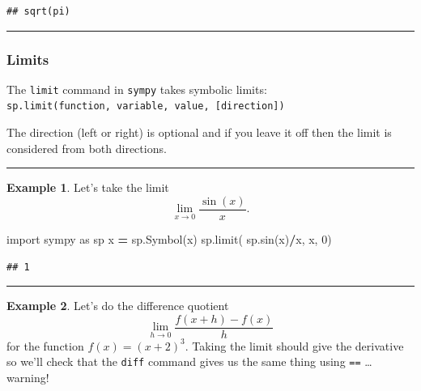 \documentclass[
]{book}
\newenvironment{Shaded}{\begin{snugshade}}{\end{snugshade}}
\newcommand{\DecValTok}[1]{\textcolor[rgb]{0.00,0.00,0.81}{#1}}
\newcommand{\ImportTok}[1]{#1}
\newcommand{\NormalTok}[1]{#1}
\newcommand{\OperatorTok}[1]{\textcolor[rgb]{0.81,0.36,0.00}{\textbf{#1}}}
\newcommand{\StringTok}[1]{\textcolor[rgb]{0.31,0.60,0.02}{#1}}
\theoremstyle{definition}
\theoremstyle{definition}
\newtheorem{example}{Example}[chapter]
\theoremstyle{definition}
\theoremstyle{remark}
\begin{document}
\begin{verbatim}
## sqrt(pi)
\end{verbatim}

\begin{center}\rule{0.5\linewidth}{0.5pt}\end{center}

\hypertarget{limits}{%
\subsubsection{Limits}\label{limits}}

The \texttt{limit} command in \texttt{sympy} takes symbolic limits: \texttt{sp.limit(function,\ variable,\ value,\ {[}direction{]})}

The direction (left or right) is optional and if you leave it off then the limit is considered from both directions.

\begin{center}\rule{0.5\linewidth}{0.5pt}\end{center}

\begin{example}
\protect\hypertarget{exm:unnamed-chunk-810}{}{\label{exm:unnamed-chunk-810} }Let's take the limit \[\lim_{x \to 0} \frac{\sin(x)}{x}.\]
\end{example}

\begin{Shaded}
\begin{Highlighting}[]
\ImportTok{import}\NormalTok{ sympy }\ImportTok{as}\NormalTok{ sp}
\NormalTok{x }\OperatorTok{=}\NormalTok{ sp.Symbol(}\StringTok{\textquotesingle{}x\textquotesingle{}}\NormalTok{)}
\NormalTok{sp.limit( sp.sin(x)}\OperatorTok{/}\NormalTok{x, x, }\DecValTok{0}\NormalTok{)}
\end{Highlighting}
\end{Shaded}

\begin{verbatim}
## 1
\end{verbatim}

\begin{center}\rule{0.5\linewidth}{0.5pt}\end{center}

\begin{example}
\protect\hypertarget{exm:unnamed-chunk-812}{}{\label{exm:unnamed-chunk-812} }Let's do the difference quotient
\[\lim_{h \to 0} \frac{ f(x+h) - f(x)}{h}\]
for the function \(f(x) = (x+2)^3\). Taking the limit should give the derivative so we'll check that the \texttt{diff} command gives us the same thing using \texttt{==} \ldots warning!
\end{example}
\end{document}

